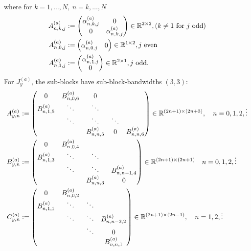 \documentclass[11pt, oneside]{article}   	%
\begin{document}
where for $k = 1,\dots,N, \: n = k,\dots,N$
\begin{align*}
	A^{(a)}_{n,k,j} &:= 
		\begin{pmatrix}
			\alpha^{(a)}_{n,k,j} & 0 \\
			0 & \alpha^{(a)}_{n,k,j}
		\end{pmatrix} \in \mathbb{R}^{2\times2}, (k \ne 1 \text { for } j \text{ odd}) \\
	A^{(a)}_{n,0,j} &:=
		\begin{pmatrix}
			\alpha^{(a)}_{n,0,j} & 0
		\end{pmatrix} \in \mathbb{R}^{1\times2}, j \text{ even} \\
	A^{(a)}_{n,1,j} &:=
		\begin{pmatrix}
			\alpha^{(a)}_{n,1,j} \\
			0
		\end{pmatrix} \in \mathbb{R}^{2\times1}, j \text{ odd}.
\end{align*}
For $J_y^{(a)}$, the sub-blocks have sub-block-bandwidths $(3,3)$:
\begin{align*}
	A^{(a)}_{y,n} &:= 
		\begin{pmatrix}
			0 & B^{(a)}_{n,0,6} & 0 & & \\
			B^{(a)}_{n,1,5} & \ddots & \ddots & & \\
			& \ddots & \ddots & \ddots & \\
			& & B^{(a)}_{n,n,5} & 0 & B^{(a)}_{n,n,6} \\
		\end{pmatrix} \in \mathbb{R}^{(2n+1)\times(2n+3)}, \quad n = 0,1,2,\vdots \\
	B^{(a)}_{y,n} &:= 
		\begin{pmatrix}
			0 & B^{(a)}_{n,0,4} & & \\
			B^{(a)}_{n,1,3} & \ddots & \ddots & \\
			& \ddots & \ddots & B^{(a)}_{n,n-1,4} \\
			& & B^{(a)}_{n,n,3} & 0
		\end{pmatrix} \in \mathbb{R}^{(2n+1)\times(2n+1)}  \quad n = 0,1,2,\vdots \\
	C^{(a)}_{y,n} &:= 
		\begin{pmatrix}
			0 & B^{(a)}_{n,0,2} & & \\
			B^{(a)}_{n,1,1} & \ddots & \ddots & \\
			& \ddots & \ddots & B^{(a)}_{n,n-2,2} \\
			& & \ddots & 0 \\
			& & & B^{(a)}_{n,n,1} \\
		\end{pmatrix} \in \mathbb{R}^{(2n+1)\times(2n-1)}, \quad n = 1,2,\vdots
\end{align*}
\end{document}
